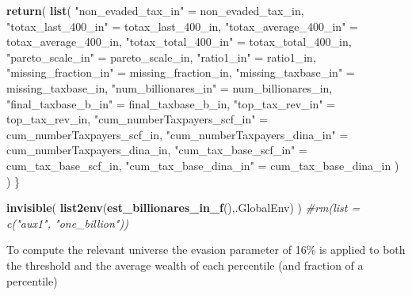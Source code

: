 \documentclass[]{article}
\newenvironment{Shaded}{\begin{snugshade}}{\end{snugshade}}
\newcommand{\CommentTok}[1]{\textcolor[rgb]{0.56,0.35,0.01}{\textit{#1}}}
\newcommand{\DecValTok}[1]{\textcolor[rgb]{0.00,0.00,0.81}{#1}}
\newcommand{\KeywordTok}[1]{\textcolor[rgb]{0.13,0.29,0.53}{\textbf{#1}}}
\newcommand{\NormalTok}[1]{#1}
\newcommand{\StringTok}[1]{\textcolor[rgb]{0.31,0.60,0.02}{#1}}
\begin{document}
\begin{Shaded}
\begin{Highlighting}[]
    \KeywordTok{return}\NormalTok{( }\KeywordTok{list}\NormalTok{( }\StringTok{"non_evaded_tax_in"}\NormalTok{ =}\StringTok{ }\NormalTok{non_evaded_tax_in, }\StringTok{"totax_last_400_in"}\NormalTok{ =}\StringTok{ }\NormalTok{totax_last_}\DecValTok{400}\NormalTok{_in, }
                  \StringTok{"totax_average_400_in"}\NormalTok{ =}\StringTok{ }\NormalTok{totax_average_}\DecValTok{400}\NormalTok{_in, }\StringTok{"totax_total_400_in"}\NormalTok{ =}\StringTok{ }
\StringTok{                    }\NormalTok{totax_total_}\DecValTok{400}\NormalTok{_in, }\StringTok{"pareto_scale_in"}\NormalTok{ =}\StringTok{ }\NormalTok{pareto_scale_in, }\StringTok{"ratio1_in"}\NormalTok{ =}\StringTok{ }\NormalTok{ratio1_in, }
                  \StringTok{"missing_fraction_in"}\NormalTok{ =}\StringTok{ }\NormalTok{missing_fraction_in, }\StringTok{"missing_taxbase_in"}\NormalTok{ =}\StringTok{ }
\StringTok{                    }\NormalTok{missing_taxbase_in, }\StringTok{"num_billionares_in"}\NormalTok{ =}\StringTok{ }\NormalTok{num_billionares_in, }
                  \StringTok{"final_taxbase_b_in"}\NormalTok{ =}\StringTok{ }\NormalTok{final_taxbase_b_in, }\StringTok{"top_tax_rev_in"}\NormalTok{ =}\StringTok{ }\NormalTok{top_tax_rev_in, }
                  \StringTok{"cum_numberTaxpayers_scf_in"}\NormalTok{ =}\StringTok{ }\NormalTok{cum_numberTaxpayers_scf_in, }
                  \StringTok{"cum_numberTaxpayers_dina_in"}\NormalTok{ =}\StringTok{ }\NormalTok{cum_numberTaxpayers_dina_in, }
                  \StringTok{"cum_tax_base_scf_in"}\NormalTok{ =}\StringTok{ }\NormalTok{cum_tax_base_scf_in, }
                  \StringTok{"cum_tax_base_dina_in"}\NormalTok{ =}\StringTok{ }\NormalTok{cum_tax_base_dina_in ) )}
\NormalTok{\}}

\KeywordTok{invisible}\NormalTok{( }\KeywordTok{list2env}\NormalTok{(}\KeywordTok{est_billionares_in_f}\NormalTok{(),.GlobalEnv) )}
\CommentTok{#rm(list = c("aux1", "one_billion"))}
\end{Highlighting}
\end{Shaded}

To compute the relevant universe the evasion parameter of 16\% is
applied to both the threshold and the average wealth of each percentile
(and fraction of a percentile)
\end{document}
